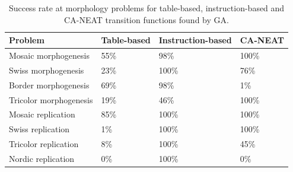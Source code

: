 \begin{table}
    \centering
    \caption{Success rate at morphology problems for table-based, instruction-based and CA-NEAT transition functions found by GA.}
    \begin{tabular}{llll}
    \hline
    Problem                & Table-based & Instruction-based & CA-NEAT \\ \hline
    Mosaic morphogenesis   & 55\%        & 98\%              & 100\%   \\
    Swiss morphogenesis    & 23\%        & 100\%             & 76\%    \\
    Border morphogenesis   & 69\%        & 98\%              & 1\%     \\
    Tricolor morphogenesis & 19\%        & 46\%              & 100\%   \\
    Mosaic replication     & 85\%        & 100\%             & 100\%   \\
    Swiss replication      & 1\%         & 100\%             & 100\%   \\
    Tricolor replication   & 8\%         & 100\%             & 45\%    \\
    Nordic replication     & 0\%         & 100\%             & 0\%     \\ \hline
    \end{tabular}
\end{table}

